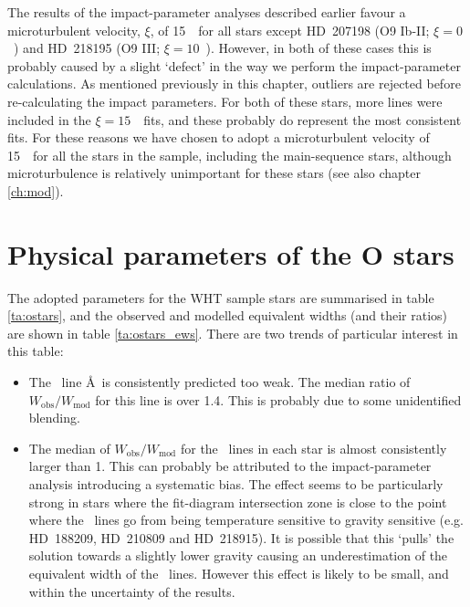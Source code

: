 The results of the impact-parameter analyses described earlier
favour a microturbulent velocity, $\xi$, of 15~\kms\ for all stars
except HD~207198 (O9 Ib-II; $\xi = 0$~\kms) and HD~218195 (O9 III;
$\xi = 10$~\kms). However, in both of these cases this is probably caused by a
slight `defect' in the way we perform the impact-parameter
calculations. As mentioned previously in this chapter, outliers are
rejected before re-calculating the impact parameters. For both of these
stars, more lines were included in the $\xi = 15$~\kms\ fits, and
these probably do represent the most consistent fits. For these
reasons we have chosen to adopt a microturbulent velocity of 15~\kms\
for all the stars in the sample, including the main-sequence stars,
although microturbulence is relatively unimportant for these stars
(see also chapter \ref{ch:mod}).


\section{Physical parameters of the O stars}

The adopted parameters for the WHT sample stars are summarised in
table \ref{ta:ostars}, and the observed and modelled equivalent widths
(and their ratios) are shown in table \ref{ta:ostars_ews}. There are
two trends of particular interest in this table:

\begin{itemize}
\item	The \hei\ line \AA\ is consistently predicted too
	weak. The median ratio of $W_\mathrm{obs}/W_\mathrm{mod}$ for
	this line is over 1.4. This is probably due to some
	unidentified blending.

\item	The median of $W_\mathrm{obs}/W_\mathrm{mod}$ for the \hei\
	lines in each star is almost consistently larger than 1. This
	can probably be attributed to the impact-parameter analysis
	introducing a systematic bias. The effect seems to be
	particularly strong in stars where the fit-diagram
	intersection zone is close to the point where the \heii\ lines
	go from being temperature sensitive to gravity sensitive
	(e.g. HD~188209, HD~210809 and HD~218915). It is possible that
	this `pulls' the solution towards a slightly lower gravity
	causing an underestimation of the equivalent width of the
	\hei\ lines. However this effect is likely to be small, and
	within the uncertainty of the results.
\end{itemize}


